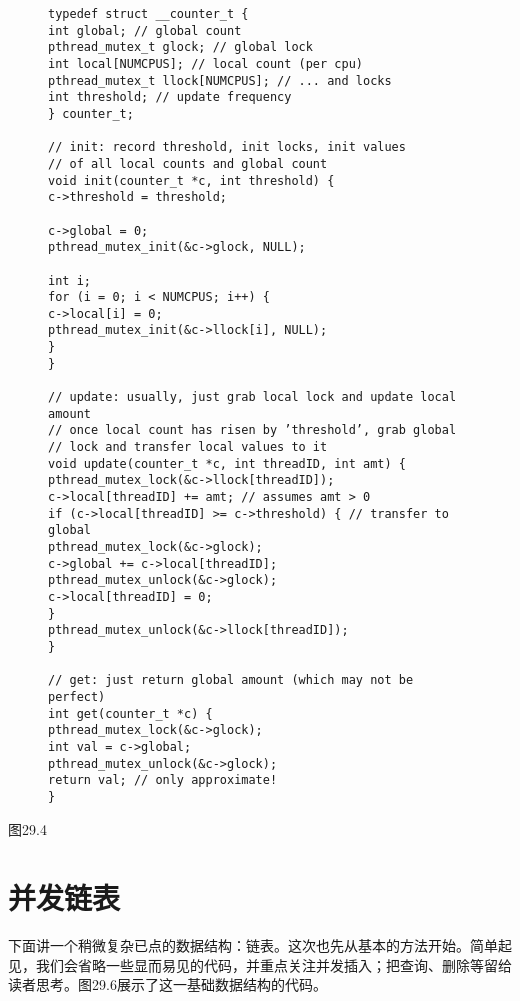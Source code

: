 \begin{figure}[h]
\begin{lstlisting}
typedef struct __counter_t {
int global; // global count
pthread_mutex_t glock; // global lock
int local[NUMCPUS]; // local count (per cpu)
pthread_mutex_t llock[NUMCPUS]; // ... and locks
int threshold; // update frequency
} counter_t;

// init: record threshold, init locks, init values
// of all local counts and global count
void init(counter_t *c, int threshold) {
c->threshold = threshold;

c->global = 0;
pthread_mutex_init(&c->glock, NULL);

int i;
for (i = 0; i < NUMCPUS; i++) {
c->local[i] = 0;
pthread_mutex_init(&c->llock[i], NULL);
}
}

// update: usually, just grab local lock and update local amount
// once local count has risen by ’threshold’, grab global
// lock and transfer local values to it
void update(counter_t *c, int threadID, int amt) {
pthread_mutex_lock(&c->llock[threadID]);
c->local[threadID] += amt; // assumes amt > 0
if (c->local[threadID] >= c->threshold) { // transfer to global
pthread_mutex_lock(&c->glock);
c->global += c->local[threadID];
pthread_mutex_unlock(&c->glock);
c->local[threadID] = 0;
}
pthread_mutex_unlock(&c->llock[threadID]);
}

// get: just return global amount (which may not be perfect)
int get(counter_t *c) {
pthread_mutex_lock(&c->glock);
int val = c->global;
pthread_mutex_unlock(&c->glock);
return val; // only approximate!
}
\end{lstlisting}
\caption{}
\end{figure}
图29.4


\section{并发链表}
下面讲一个稍微复杂已点的数据结构：链表。这次也先从基本的方法开始。简单起见，我们会省略一些显而易见的代码，并重点关注并发插入；把查询、删除等留给读者思考。图29.6展示了这一基础数据结构的代码。

